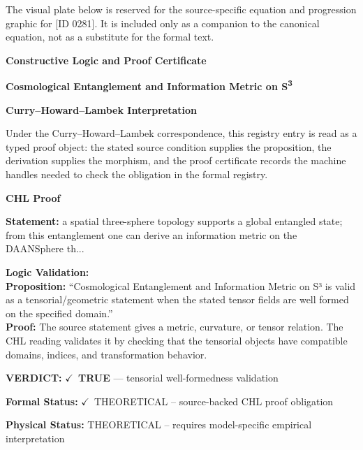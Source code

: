 \begingroup\footnotesize\sloppy
The visual plate below is reserved for the source-specific equation and progression graphic for [ID 0281]. It is included only as a companion to the canonical equation, not as a substitute for the formal text.
\par\endgroup
\ifTZPDarkEdition
{}
\fi

\clearpage
\begingroup\tzpsupportsetup
\noindent\textbf{\fontsize{10.8pt}{12.8pt}\selectfont [ID 0281] Constructive Logic and Proof Certificate}\par
\noindent\textbf{\fontsize{10pt}{12pt}\selectfont Cosmological Entanglement and Information Metric on S\textsuperscript3}\par
\vspace{0.45em}
\begingroup
\footnotesize
\setlength{\parskip}{0.22em}
\setlength{\parindent}{0pt}
\noindent\textbf{Curry--Howard--Lambek Interpretation}\par
Under the Curry--Howard--Lambek correspondence, this registry entry is read as a typed proof
object: the stated source condition supplies the proposition, the derivation supplies the
morphism, and the proof certificate records the machine handles needed to check the obligation
in the formal registry.

\vspace{0.45em}
\noindent\textbf{CHL Proof}\par
\textbf{Statement:} a spatial three-sphere topology supports a global entangled state; from this
entanglement one can derive an information metric on the DAANSphere th...

\textbf{Logic Validation:}\\
\textbf{Proposition:} ``Cosmological Entanglement and Information Metric on S³ is valid as a tensorial/geometric
statement when the stated tensor fields are well formed on the specified domain.''\\
\textbf{Proof:} The source statement gives a metric, curvature, or tensor relation. The CHL reading
validates it by checking that the tensorial objects have compatible domains, indices,
and transformation behavior.

\textbf{VERDICT:} \ensuremath{\checkmark}\ \textbf{TRUE} --- tensorial well-formedness validation

\textbf{Formal Status:} \ensuremath{\checkmark}\ THEORETICAL -- source-backed CHL proof obligation

\textbf{Physical Status:} THEORETICAL -- requires model-specific empirical interpretation
\par\vspace{0.45em}
\par
\ifTZPDarkEdition
{}
\fi
\endgroup
\endgroup
